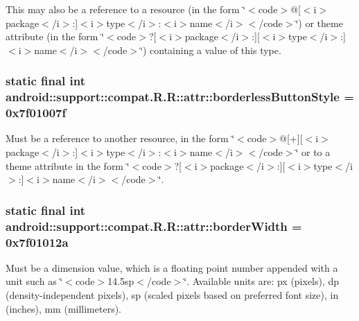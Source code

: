 This may also be a reference to a resource (in the form \char`\"{}$<$code$>$@\mbox{[}$<$i$>$package$<$/i$>$:\mbox{]}$<$i$>$type$<$/i$>$:$<$i$>$name$<$/i$>$$<$/code$>$\char`\"{}) or theme attribute (in the form \char`\"{}$<$code$>$?\mbox{[}$<$i$>$package$<$/i$>$:\mbox{]}\mbox{[}$<$i$>$type$<$/i$>$:\mbox{]}$<$i$>$name$<$/i$>$$<$/code$>$\char`\"{}) containing a value of this type. \hypertarget{classandroid_1_1support_1_1compat_1_1_r_1_1attr_b9fccec7050667e867bfb164ee133417}{
\subsubsection[{borderlessButtonStyle}]{\setlength{\rightskip}{0pt plus 5cm}static final int android::support::compat.R.R::attr::borderlessButtonStyle = 0x7f01007f}}
\label{classandroid_1_1support_1_1compat_1_1_r_1_1attr_b9fccec7050667e867bfb164ee133417}


Must be a reference to another resource, in the form \char`\"{}$<$code$>$@\mbox{[}+\mbox{]}\mbox{[}$<$i$>$package$<$/i$>$:\mbox{]}$<$i$>$type$<$/i$>$:$<$i$>$name$<$/i$>$$<$/code$>$\char`\"{} or to a theme attribute in the form \char`\"{}$<$code$>$?\mbox{[}$<$i$>$package$<$/i$>$:\mbox{]}\mbox{[}$<$i$>$type$<$/i$>$:\mbox{]}$<$i$>$name$<$/i$>$$<$/code$>$\char`\"{}. \hypertarget{classandroid_1_1support_1_1compat_1_1_r_1_1attr_e97250accd138e4eb1460af199484826}{
\subsubsection[{borderWidth}]{\setlength{\rightskip}{0pt plus 5cm}static final int android::support::compat.R.R::attr::borderWidth = 0x7f01012a}}
\label{classandroid_1_1support_1_1compat_1_1_r_1_1attr_e97250accd138e4eb1460af199484826}


Must be a dimension value, which is a floating point number appended with a unit such as \char`\"{}$<$code$>$14.5sp$<$/code$>$\char`\"{}. Available units are: px (pixels), dp (density-independent pixels), sp (scaled pixels based on preferred font size), in (inches), mm (millimeters). 


